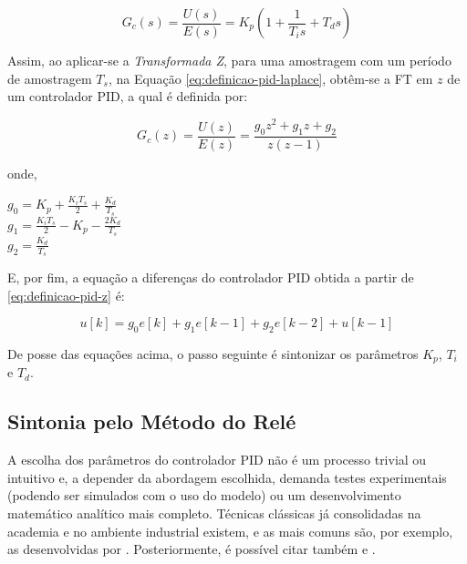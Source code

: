 			\begin{equation}
				\label{eq:definicao-pid-laplace}
				G_c(s) = \frac{U(s)}{E(s)} = K_p \left( 1 + \frac{1}{T_i s} + T_d s \right)
			\end{equation}
			
			Assim, ao aplicar-se a \textit{Transformada Z}, para uma amostragem com um período de amostragem $T_s$, na Equação \ref{eq:definicao-pid-laplace}, obtêm-se a \gls{FT} em $z$ de um controlador \gls{PID}, a qual é definida por:

			\begin{equation}
				\label{eq:definicao-pid-z}
				G_c(z) = \frac{U(z)}{E(z)} = \frac{g_0 z^2 + g_1 z + g_2}{z(z-1)}
			\end{equation}

			\noindent
			onde,

			\begin{center}
				$g_0 = K_p + \frac{K_i T_s}{2} + \frac{K_d}{T_s}$ \\
				$g_1 = \frac{K_i T_s}{2} - K_p - \frac{2 K_d}{T_s}$ \\
				$g_2 = \frac{K_d}{T_s}$
			\end{center}

			E, por fim, a equação a diferenças do controlador \gls{PID} obtida a partir de \ref{eq:definicao-pid-z} é:

			\begin{equation}
				\label{eq:equaca-diferenca-pid}
				u[k] = g_0 e[k] + g_1 e[k-1] + g_2 e[k-2] + u[k-1]
			\end{equation}

			De posse das equações acima, o passo seguinte é sintonizar os parâmetros $K_p$, $T_i$ e $T_d$.

		\subsection{Sintonia pelo Método do Relé} \label{sec:autossintonia-rele}

			A escolha dos parâmetros do controlador \gls{PID} não é um processo trivial ou intuitivo e, a depender da abordagem escolhida, demanda testes experimentais (podendo ser simulados com o uso do modelo) ou um desenvolvimento matemático analítico mais completo. Técnicas clássicas já consolidadas na academia e no ambiente industrial existem, e as mais comuns são, por exemplo, as desenvolvidas por . Posteriormente, é possível citar também  e .

